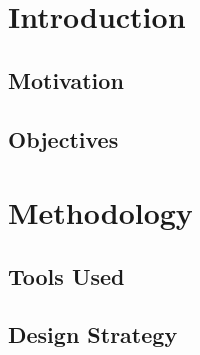 \documentclass{report}
\begin{document}
\tableofcontents
\newpage

\chapter{Introduction}
\section{Motivation}
\section{Objectives}

\chapter{Methodology}
\section{Tools Used}
\section{Design Strategy}
\end{document}
